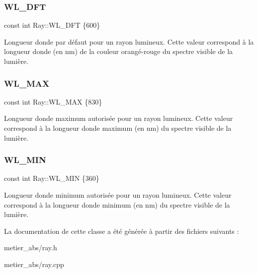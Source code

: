 \subsubsection{\texorpdfstring{WL\_DFT}{WL\_DFT}}
{\footnotesize\ttfamily const int Ray\+::\+W\+L\+\_\+\+D\+FT \{600\}\hspace{0.3cm}{\ttfamily [static]}}

Longueur d\textquotesingle{}onde par défaut pour un rayon lumineux. Cette valeur correspond à la longueur d\textquotesingle{}onde (en nm) de la couleur orangé-\/rouge du spectre visible de la lumière. \mbox{\label{class_ray_add278b4978966f54e3c22e8be2224b7f}} 
\subsubsection{\texorpdfstring{WL\_MAX}{WL\_MAX}}
{\footnotesize\ttfamily const int Ray\+::\+W\+L\+\_\+\+M\+AX \{830\}\hspace{0.3cm}{\ttfamily [static]}}

Longueur d\textquotesingle{}onde maximum autorisée pour un rayon lumineux. Cette valeur correspond à la longueur d\textquotesingle{}onde maximum (en nm) du spectre visible de la lumière. \mbox{\label{class_ray_a478177dabc9f1a3a0ba7d8b388a58b7e}} 
\subsubsection{\texorpdfstring{WL\_MIN}{WL\_MIN}}
{\footnotesize\ttfamily const int Ray\+::\+W\+L\+\_\+\+M\+IN \{360\}\hspace{0.3cm}{\ttfamily [static]}}

Longueur d\textquotesingle{}onde minimum autorisée pour un rayon lumineux. Cette valeur correspond à la longueur d\textquotesingle{}onde minimum (en nm) du spectre visible de la lumière. 

La documentation de cette classe a été générée à partir des fichiers suivants \+:\begin{DoxyCompactItemize}
\item 
metier\+\_\+abs/ray.\+h\item 
metier\+\_\+abs/ray.\+cpp\end{DoxyCompactItemize}
